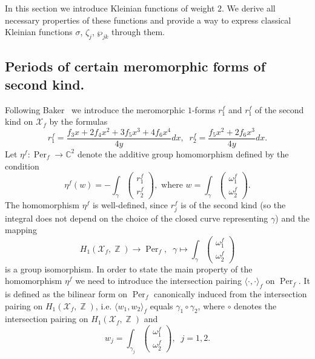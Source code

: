 \documentclass{amsart}
\numberwithin{equation}{section}
\theoremstyle{definition}
\theoremstyle{remark}
\DeclareMathOperator{\ZZ}{\mathbb Z}
\DeclareMathOperator{\Per}{Per}
\begin{document}
	In this section we introduce Kleinian functions of weight $2$. We derive all necessary properties of these functions and provide a way to express classical Kleinian functions $\sigma$, $\zeta_j$, $\wp_{jk}$ through them.
	
	\subsection{Periods of certain meromorphic forms of second kind.} Following Baker~\cite{baker} we introduce the meromorphic $1$-forms $r_1^f$ and $r_1^f$ of the second kind on $\mathcal X_f$ by the formulas
	\begin{equation}\label{eqRDef}
		r_1^f = \frac{f_3x + 2f_4x^2 + 3f_5x^3 + 4f_6x^4}{4y}dx,\;\;r_2^f = \frac{f_5x^2 + 2f_6x^3}{4y}dx.
	\end{equation}
	Let $\eta^f:\Per_f \to \mathbb C^2$ denote the additive group homomorphism defined by the condition
	\begin{equation}\label{eqEtaDef}
		\eta^f(w) = -\int_\gamma \begin{pmatrix} r_1^f \\ r_2^f\end{pmatrix},\text{ where } w = \int_\gamma \begin{pmatrix} \omega_1^f \\ \omega_2^f \end{pmatrix}.
	\end{equation}
	The homomorphism $\eta^f$ is well-defined, since $r_j^f$ is of the second kind (so the integral does not depend on the choice of the closed curve representing $\gamma$) and the mapping 
	\[
	H_1(\mathcal X_f, \ZZ) \to \Per_f,\;\;\gamma \mapsto  \int_\gamma \begin{pmatrix} \omega_1^f \\ \omega_2^f \end{pmatrix}
	\]
	is a group isomorphism. In order to state the main property of the homomorphism $\eta^f$ we need to introduce the intersection pairing $\langle \cdot,\cdot\rangle_{f}$ on $\Per_f$. It is defined as the bilinear form on $\Per_f$ canonically induced from the intersection pairing on $H_1(\mathcal X_f, \ZZ)$, i.e. $\langle w_1, w_2\rangle_f$ equals $\gamma_1 \circ \gamma_2$, where $\circ$ denotes the intersection pairing on $H_1(\mathcal X_f, \ZZ)$ and
	\[
	w_j = \int_{\gamma_j} \begin{pmatrix} \omega_1^f \\ \omega_2^f \end{pmatrix}, \;\;j = 1,2.
	\]
\end{document}
